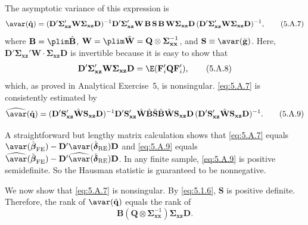 The asymptotic variance of this expression is
\begin{equation}
  \avar(\hat{\mathbf{q}})
  = (\mathbf{D}'\boldsymbol{\Sigma}_{\mathbf{xz}}'\mathbf{W}\boldsymbol{\Sigma}_{\mathbf{xz}}\mathbf{D})^{-1}
    \mathbf{D}'\boldsymbol{\Sigma}_{\mathbf{xz}}'\mathbf{W}\,\mathbf{B}\,\mathbf{S}\,\mathbf{B}\,
    \mathbf{W}\boldsymbol{\Sigma}_{\mathbf{xz}}\mathbf{D}\,
    (\mathbf{D}'\boldsymbol{\Sigma}_{\mathbf{xz}}'\mathbf{W}\boldsymbol{\Sigma}_{\mathbf{xz}}\mathbf{D})^{-1},
  \label{eq:5.A.7} \tag{5.A.7}
\end{equation}
where $\mathbf{B} = \plim\hat{\mathbf{B}}$,
$\mathbf{W} = \plim\hat{\mathbf{W}} = \mathbf{Q} \otimes \boldsymbol{\Sigma}_{\mathbf{xx}}^{-1}$,
and $\mathbf{S} \equiv \avar(\bar{\mathbf{g}})$.
Here, $\mathbf{D}'\boldsymbol{\Sigma}_{\mathbf{xz}}'\mathbf{W} \cdot \boldsymbol{\Sigma}_{\mathbf{xz}}\mathbf{D}$
is invertible because it is easy to show that
\begin{equation}
  \mathbf{D}'\boldsymbol{\Sigma}_{\mathbf{xz}}'\mathbf{W}\boldsymbol{\Sigma}_{\mathbf{xz}}\mathbf{D}
  = \E(\mathbf{F}_i'\mathbf{Q}\mathbf{F}_i'),
  \label{eq:5.A.8} \tag{5.A.8}
\end{equation}
which, as proved in Analytical Exercise~5, is nonsingular. \eqref{eq:5.A.7} is consistently
estimated by
\begin{equation}
  \widehat{\avar}(\hat{\mathbf{q}})
  = (\mathbf{D}'\mathbf{S}_{\mathbf{xz}}'\hat{\mathbf{W}}\mathbf{S}_{\mathbf{xz}}\mathbf{D})^{-1}
    \mathbf{D}'\mathbf{S}_{\mathbf{xz}}'\hat{\mathbf{W}}\hat{\mathbf{B}}\hat{\mathbf{S}}
    \hat{\mathbf{B}}\hat{\mathbf{W}}\mathbf{S}_{\mathbf{xz}}\mathbf{D}\,
    (\mathbf{D}'\mathbf{S}_{\mathbf{xz}}'\hat{\mathbf{W}}\mathbf{S}_{\mathbf{xz}}\mathbf{D})^{-1}.
  \label{eq:5.A.9} \tag{5.A.9}
\end{equation}

A straightforward but lengthy matrix calculation shows that \eqref{eq:5.A.7} equals
$\avar(\hat{\boldsymbol{\beta}}_{\text{FE}}) - \mathbf{D}'\avar(\hat{\boldsymbol{\delta}}_{\text{RE}})\mathbf{D}$
and \eqref{eq:5.A.9} equals
$\widehat{\avar}(\hat{\boldsymbol{\beta}}_{\text{FE}}) - \mathbf{D}'\widehat{\avar}(\hat{\boldsymbol{\delta}}_{\text{RE}})\mathbf{D}$.
In any finite sample, \eqref{eq:5.A.9} is positive semidefinite. So the Hausman statistic is
guaranteed to be nonnegative.

We now show that \eqref{eq:5.A.7} is nonsingular. By \eqref{eq:5.1.6}, $\mathbf{S}$ is positive definite.
Therefore, the rank of $\avar(\hat{\mathbf{q}})$ equals the rank of
\begin{equation}
  \mathbf{B}(\mathbf{Q} \otimes \boldsymbol{\Sigma}_{\mathbf{xx}}^{-1})\boldsymbol{\Sigma}_{\mathbf{xz}}\mathbf{D}.
  \label{eq:5.A.10} \tag{5.A.10}
\end{equation}

